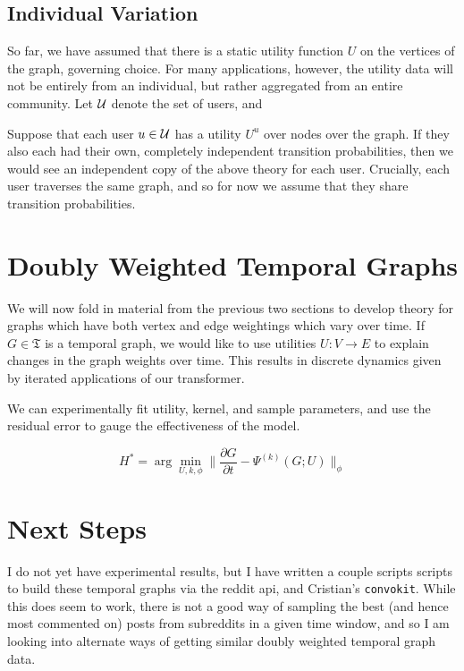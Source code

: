 \documentclass{article}
\theoremstyle{definition}
\begin{document}
	
	
	\subsection{Individual Variation}
	So far, we have assumed that there is a static utility function $U$ on the vertices of the graph, governing choice. For many applications, however, the utility data will not be entirely from an individual, but rather aggregated from an entire community. Let $\cal U$ denote the set of users, and 
	
	Suppose that each user $u \in \cal U$ has a utility $U^u$ over nodes over the graph. If they also each had their own, completely independent transition probabilities, then we would see an independent copy of the above theory for each user. Crucially, each user traverses the same graph, and so for now we assume that they share transition probabilities. 
	
	\section{Doubly Weighted Temporal Graphs}
	We will now fold in material from the previous two sections to develop theory for graphs which have both vertex and edge weightings which vary over time. If $G \in \mathfrak T$ is a temporal graph, we would like to use utilities $U : V \to E$ to explain changes in the graph weights over time. This results in discrete dynamics given by iterated applications of our transformer.
	
	We can experimentally fit utility, kernel, and sample parameters, and use the residual error to gauge the effectiveness of the model.
	
	\[ H^* = \arg\min_{U,k,\phi} \Big\lVert \frac{\partial G}{\partial t} - \Psi^{(k)}(G;U)  \Big\rVert_\phi \]
	
	\section{Next Steps}
	I do not yet have experimental results, but I have written a couple scripts scripts to build these temporal graphs via the reddit api, and Cristian's \texttt{convokit}. While this does seem to work, there is not a good way of sampling the best (and hence most commented on) posts from subreddits in a given time window, and so I am looking into alternate ways of getting similar doubly weighted temporal graph data.
	
\end{document}
